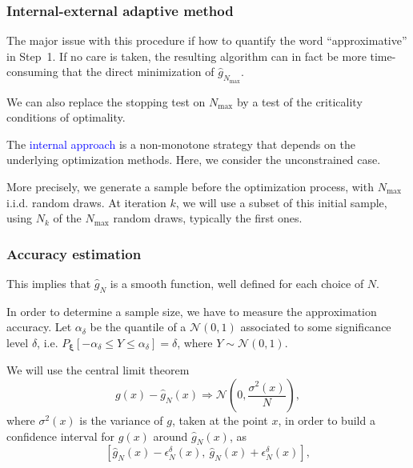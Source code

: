 \documentclass{beamer}
\def\bxi{\boldsymbol\xi}
\def\cN{\mathcal{N}}
\begin{document}
\begin{frame}
\frametitle{Internal-external adaptive method}

The major issue with this procedure if how to quantify the word ``approximative'' in Step~1.
If no care is taken, the resulting algorithm can in fact be more time-consuming that the direct minimization of $\hat{g}_{N_{\max}}$.

\mbox{}

We can also replace the stopping test on $N_{\max}$ by a test of the criticality conditions of optimality.

\mbox{}

The \textcolor{blue}{internal approach} is a non-monotone strategy that depends on the underlying optimization methods.
Here, we consider the unconstrained case.

\mbox{}

More precisely, we generate a sample before the optimization process, with $N_{\max}$ i.i.d. random draws.
At iteration $k$, we will use a subset of this initial sample, using $N_k$ of the $N_{\max}$ random draws, typically the first ones.

\end{frame}

\begin{frame}
\frametitle{Accuracy estimation}

This implies that $\hat{g}_N$ is a smooth function, well defined for each choice of $N$.


In order to determine a sample size, we have to measure the approximation accuracy.
Let $\alpha_{\delta}$ be the quantile of a $\cN(0,1)$ associated to some significance level $\delta$, i.e. $P_{\bxi} [ -\alpha_{\delta} \leq Y \leq \alpha_{\delta} ] = \delta$, where $Y \sim \cN(0,1)$.

\mbox{}

We will use the central limit theorem
\[
g(x) - \hat{g}_N(x) \Rightarrow \cN \left( 0, \frac{\sigma^2(x)}{N} \right),
\]
where $\sigma^2(x)$ is the variance of $g$, taken at the point $x$, in order to build a confidence interval for $g(x)$ around $\hat{g}_N(x)$, as
\[
[\hat{g}_N(x) - \epsilon^{\delta}_N(x),\ \hat{g}_N(x) + \epsilon^{\delta}_N(x)],
\]

\end{frame}
\end{document}
